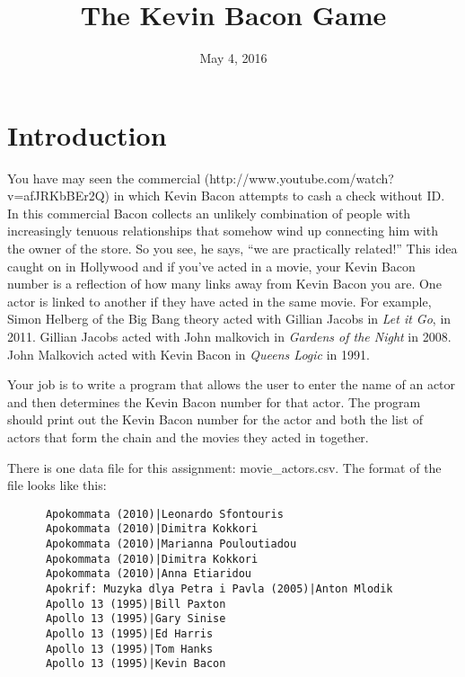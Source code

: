 \documentclass[11pt]{article}
\title{The Kevin Bacon Game}
\date{May 4, 2016}
\begin{document}
\maketitle
\lstset{language=Python,numbers=left}

\section{Introduction}
You have may seen the commercial (http://www.youtube.com/watch?v=afJRKbBEr2Q) in which Kevin Bacon attempts to cash a check without ID.  In this commercial Bacon collects an unlikely combination of people with increasingly tenuous relationships that somehow wind up connecting him with the owner of the store.  So you see, he says, ``we are practically related!''  This idea caught on in Hollywood and if you've acted in a movie, your Kevin Bacon number is a reflection of how many links away from Kevin Bacon you are.  One actor is linked to another if they have acted in the same movie.  For example, Simon Helberg of the Big Bang theory acted with Gillian Jacobs in \textit{Let it Go}, in 2011.  Gillian Jacobs acted with John malkovich in \textit{Gardens of the Night} in 2008.  John Malkovich acted with Kevin Bacon in \textit{Queens Logic} in 1991.

Your job is to write a program that allows the user to enter the name of an actor and then determines the Kevin Bacon number for that actor.  The program should print out the Kevin Bacon number for the actor and both the list of actors that form the chain and the movies they acted in together.

There is one data file for this assignment:  movie\_actors.csv.  The format of the file looks like this:
\vspace{.1in}


    \begin{minipage}[b]{0.33\textwidth}
    \begin{verbatim}
      Apokommata (2010)|Leonardo Sfontouris
      Apokommata (2010)|Dimitra Kokkori
      Apokommata (2010)|Marianna Pouloutiadou
      Apokommata (2010)|Dimitra Kokkori
      Apokommata (2010)|Anna Etiaridou
      Apokrif: Muzyka dlya Petra i Pavla (2005)|Anton Mlodik
      Apollo 13 (1995)|Bill Paxton
      Apollo 13 (1995)|Gary Sinise
      Apollo 13 (1995)|Ed Harris
      Apollo 13 (1995)|Tom Hanks
      Apollo 13 (1995)|Kevin Bacon
    \end{verbatim}
  \end{minipage}
\end{document}
